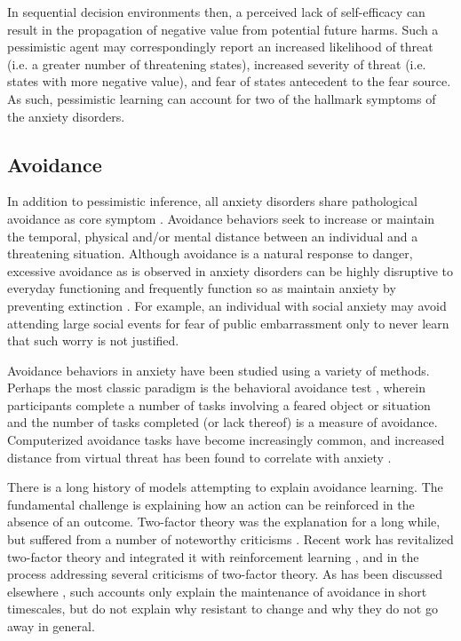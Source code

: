 \documentclass[11pt]{article} %
\begin{document}
In sequential decision environments then, a perceived lack of self-efficacy can result in the propagation of negative value from potential future harms. Such a pessimistic agent may correspondingly report an increased likelihood of threat (i.e. a greater number of threatening states), increased severity of threat (i.e. states with more negative value), and fear of states antecedent to the fear source. As such, pessimistic learning can account for two of the hallmark symptoms of the anxiety disorders.

\subsection{Avoidance}

In addition to pessimistic inference, all anxiety disorders share pathological avoidance as core symptom \citep{dsm5, Krypotos2015, Arnaudova2017}. Avoidance behaviors seek to increase or maintain the temporal, physical and/or mental distance between an individual and a threatening situation. Although avoidance is a natural response to danger, excessive avoidance as is observed in anxiety disorders can be highly disruptive to everyday functioning \citep{Salter2004} and frequently function so as maintain anxiety by preventing extinction \citep{Arnaudova2017}. For example, an individual with social anxiety may avoid attending large social events for fear of public embarrassment only to never learn that such worry is not justified.

Avoidance behaviors in anxiety have been studied using a variety of methods. Perhaps the most classic paradigm is the behavioral avoidance test \citep{bandura1977}, wherein participants complete a number of tasks involving a feared object or situation and the number of tasks completed (or lack thereof) is a measure of avoidance. Computerized avoidance tasks have become increasingly common, and increased distance from virtual threat has been found to correlate with anxiety \citep{Bach2014, Bach2017, Sheynin2014}.

There is a long history of models attempting to explain avoidance learning. The fundamental challenge is explaining how an action can be reinforced in the absence of an outcome. Two-factor theory was the explanation for a long while, but suffered from a number of noteworthy criticisms \citep{Krypotos2015}. Recent work has revitalized two-factor theory and integrated it with reinforcement learning \citep{Moutoussis2008, Maia2010}, and in the process addressing several criticisms of two-factor theory. As has been discussed elsewhere \citep{Moutoussis2017}, such accounts only explain the maintenance of avoidance in short timescales, but do not explain why resistant to change and why they do not go away in general.
\end{document}
